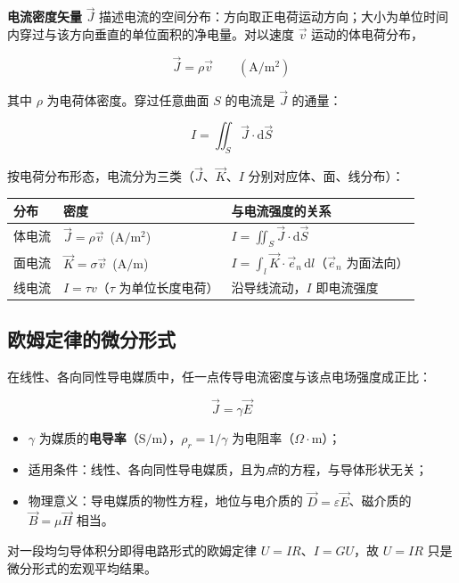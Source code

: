 \textbf{电流密度矢量} $\vec{J}$ 描述电流的空间分布：方向取正电荷运动方向；大小为单位时间内穿过与该方向垂直的单位面积的净电量。对以速度 $\vec{v}$ 运动的体电荷分布，
\begin{formulaBox}
\[
\vec{J}=\rho\vec{v}\qquad(\mathrm{A/m^2})
\]
\end{formulaBox}
其中 $\rho$ 为电荷体密度。穿过任意曲面 $S$ 的电流是 $\vec{J}$ 的通量：
\begin{formulaBox}
\[
I=\iint_S \vec{J}\cdot\mathrm{d}\vec{S}
\]
\end{formulaBox}
按电荷分布形态，电流分为三类（$\vec{J}$、$\vec{K}$、$I$ 分别对应体、面、线分布）：
\begin{center}
\small
\begin{tabularx}{\linewidth}{@{}l l X@{}}
\toprule
\textbf{分布} & \textbf{密度} & \textbf{与电流强度的关系} \\
\midrule
体电流 & $\vec{J}=\rho\vec{v}$\ ($\mathrm{A/m^2}$) & $I=\displaystyle\iint_S \vec{J}\cdot\mathrm{d}\vec{S}$ \\
面电流 & $\vec{K}=\sigma\vec{v}$\ ($\mathrm{A/m}$) & $I=\displaystyle\int_l \vec{K}\cdot\vec{e}_n\,\mathrm{d}l$（$\vec{e}_n$ 为面法向） \\
线电流 & $I=\tau v$（$\tau$ 为单位长度电荷） & 沿导线流动，$I$ 即电流强度 \\
\bottomrule
\end{tabularx}
\end{center}


\subsection{欧姆定律的微分形式}
在线性、各向同性导电媒质中，任一点传导电流密度与该点电场强度成正比：
\begin{formulaBox}
\[
\vec{J}=\gamma\vec{E}
\]
\end{formulaBox}
\begin{itemize}
  \item $\gamma$ 为媒质的\textbf{电导率}（$\mathrm{S/m}$），$\rho_r=1/\gamma$ 为电阻率（$\Omega\cdot\mathrm{m}$）；
  \item 适用条件：线性、各向同性导电媒质，且为\emph{点}的方程，与导体形状无关；
  \item 物理意义：导电媒质的物性方程，地位与电介质的 $\vec{D}=\varepsilon\vec{E}$、磁介质的 $\vec{B}=\mu\vec{H}$ 相当。
\end{itemize}
对一段均匀导体积分即得电路形式的欧姆定律 $U=IR$、$I=GU$，故 $U=IR$ 只是微分形式的宏观平均结果。

